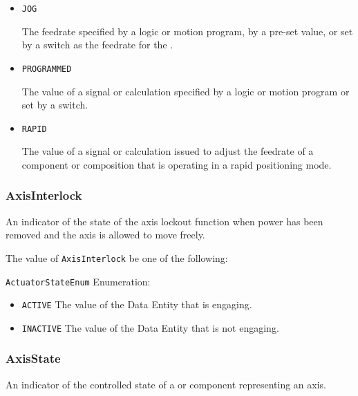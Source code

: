 \begin{itemize}

\item \texttt{JOG}


The feedrate specified by a logic or motion program, by a pre-set value, or set by a switch as the feedrate for the . 

\item \texttt{PROGRAMMED}


The value of a signal or calculation specified by a logic or motion program or set by a switch.

\item \texttt{RAPID}


The value of a signal or calculation issued to adjust the feedrate of a component or composition that is operating in a rapid positioning mode.


\end{itemize}






\subsubsection{AxisInterlock}
\label{sec:AxisInterlock}



An indicator of the state of the axis lockout function when power has been removed and the axis is allowed to move freely.


The value of \texttt{AxisInterlock} \MUST be one of the following: 


\texttt{ActuatorStateEnum} Enumeration:

\begin{itemize}
\item \texttt{ACTIVE} \newline The value of the \gls{Data Entity} that is engaging. 
\item \texttt{INACTIVE} \newline The value of the \gls{Data Entity} that is not engaging. 
\end{itemize}



\subsubsection{AxisState}
\label{sec:AxisState}



An indicator of the controlled state of a  or  component representing an axis.


